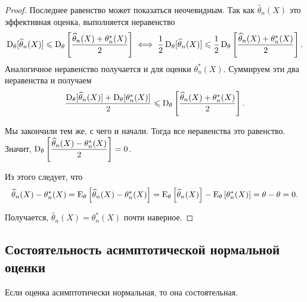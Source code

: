 \begin{proof}
    Последнее равенство может показаться неочевидным. Так как $\widehat{\theta}_n(X)$ это эффективная оценка, выполняется неравенство 
    \begin{equation*}
        \operatorname{D}_{\theta}[\widehat{\theta}_n(X)] \leqslant \operatorname{D}_{\theta}\left[ \dfrac{\widehat{\theta}_n(X) + \theta_n^*(X)}{2} \right] 
        \iff
        \dfrac{1}{2} \operatorname{D}_{\theta}[\widehat{\theta}_n(X)] \leqslant \dfrac{1}{2} \operatorname{D}_{\theta}\left[ \dfrac{\widehat{\theta}_n(X) + \theta_n^*(X)}{2} \right].
    \end{equation*}
    Аналогичное неравенство получается и для оценки $\theta_n^*(X)$. Суммируем эти два неравенства и получаем
    \begin{equation*}
        \dfrac{\operatorname{D}_{\theta}[\widehat{\theta}_n(X)] + \operatorname{D}_{\theta}[\theta_n^*(X)]}{2}
        \leqslant \operatorname{D}_{\theta}\left[ \dfrac{\widehat{\theta}_n(X) + \theta_n^*(X)}{2} \right].
    \end{equation*}

    Мы закончили тем же, с чего и начали. Тогда все неравенства это равенство. Значит, $\operatorname{D}_{\theta}\left[ \dfrac{\widehat{\theta}_n(X) - \theta_n^*(X)}{2} \right] = 0$. 

    Из этого следует, что 
    \begin{equation*}
        \widehat{\theta}_n(X) - \theta_n^*(X)
        = \operatorname{E}_{\theta}\left[ \widehat{\theta}_n(X) - \theta_n^*(X) \right] 
        =
        \operatorname{E}_{\theta}\left[ \widehat{\theta}_n(X) \right] - \operatorname{E}_{\theta}\left[ \theta_n^*(X) \right] 
        = \theta - \theta
        = 0.
    \end{equation*}

    Получается, $\widehat{\theta}_n(X) = \theta_n^*(X)$ почти наверное.
\end{proof}

\subsection{Состоятельность асимптотической нормальной оценки}

\begin{proposition*}
    Если оценка асимптотически нормальная, то она состоятельная.
\end{proposition*}

